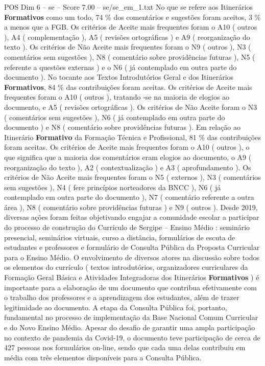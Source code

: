 \begin{textsample}{POS Dim 6 – se – Score 7.00 – se/se\_em\_1.txt}
No que se refere aos Itinerários \textbf{Formativos} como um todo, 74 \% dos comentários e sugestões foram aceitos, 3 \% a menos que a FGB.
Os critérios de Aceite mais frequentes foram o A10 ( outros ), A4 ( complementação ), A5 ( revisões ortográficas ) e A9 ( reorganização do texto ).
Os critérios de Não Aceite mais frequentes foram o N9 ( outros ), N3 ( comentários sem sugestões ), N8 ( comentário sobre providências futuras ), N5 ( referente a questões externas ) e o N6 ( já contemplado em outra parte do documento ).
No tocante aos Textos Introdutórios Geral e dos Itinerários \textbf{Formativos}, 84 \% das contribuições foram aceitas.
Os critérios de Aceite mais frequentes foram o A10 ( outros ), tratando -se na maioria de elogios ao documento, e A5 ( revisões ortográficas ).
Os critérios de Não Aceite foram o N3 ( comentários sem sugestões ), N6 ( já contemplado em outra parte do documento ) e N8 ( comentário sobre providências futuras ).
Em relação ao Itinerário \textbf{Formativo} da Formação Técnica e Profissional, 81 \% das contribuições foram aceitas.
Os critérios de Aceite mais frequentes foram o A10 ( outros ), o que significa que a maioria dos comentários eram elogios ao documento, o A9 ( reorganização do texto ), A2 ( contextualização ) e A3 ( aprofundamento ).
Os critérios de Não Aceite mais frequentes foram o N5 ( externos ), N3 ( comentários sem sugestões ), N4 ( fere princípios norteadores da BNCC ), N6 ( já contemplado em outra parte do documento ), N7 ( comentário referente a outra área ), N8 ( comentário sobre providências futuras ) e N9 ( outros ).
Desde 2019, diversas ações foram feitas objetivando engajar a comunidade escolar a participar do processo de construção do Currículo de Sergipe – Ensino Médio : seminário presencial, seminários virtuais, curso a distância, formulários de escuta de estudantes e professores e formulário de Consulta Pública da Proposta Curricular para o Ensino Médio.
O envolvimento de diversos atores na discussão sobre todos os elementos do currículo ( textos introdutórios, organizadores curriculares da Formação Geral Básica e Atividades Integradoras dos Itinerários \textbf{Formativos} ) é importante para a elaboração de um documento que contribua efetivamente com o trabalho dos professores e a aprendizagem dos estudantes, além de trazer legitimidade ao documento.
A etapa da Consulta Pública foi, portanto, fundamental no processo de implementação da Base Nacional Comum Curricular e do Novo Ensino Médio.
Apesar do desafio de garantir uma ampla participação no contexto de pandemia da Covid-19, o documento teve participação de cerca de 427 pessoas nos formulários on-line, sendo que cada uma delas contribuiu em média com três elementos disponíveis para a Consulta Pública.

\end{textsample}
